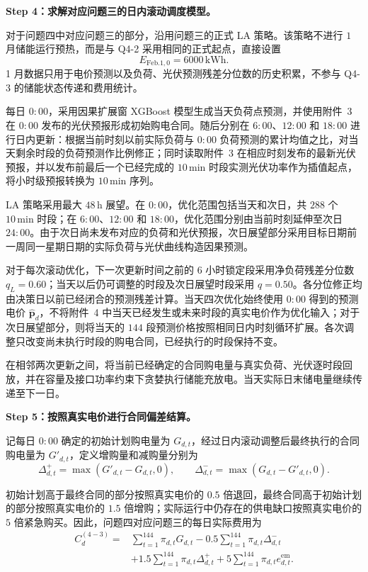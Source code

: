 \textbf{Step 4：求解对应问题三的日内滚动调度模型。}

对于问题四中对应问题三的部分，沿用问题三的正式 LA 策略。该策略不进行 $1$ 月储能运行预热，而是与 Q4-2 采用相同的正式起点，直接设置
\begin{equation}
E_{\mathrm{Feb.1},0}=6000\,\mathrm{kWh}.
\end{equation}
1 月数据只用于电价预测以及负荷、光伏预测残差分位数的历史积累，不参与 Q4-3 的储能状态传递和费用统计。

每日 $0{:}00$，采用因果扩展窗 XGBoost 模型生成当天负荷点预测，并使用附件~3 在 $0{:}00$ 发布的光伏预报形成初始购电合同。随后分别在 $6{:}00$、$12{:}00$ 和 $18{:}00$ 进行日内更新：根据当前时刻以前实际负荷与 $0{:}00$ 负荷预测的累计均值之比，对当天剩余时段的负荷预测作比例修正；同时读取附件~3 在相应时刻发布的最新光伏预报，并以发布前最后一个已经完成的 $10\,\mathrm{min}$ 时段实测光伏功率作为插值起点，将小时级预报转换为 $10\,\mathrm{min}$ 序列。

LA 策略采用最大 $48\,\mathrm{h}$ 展望。在 $0{:}00$，优化范围包括当天和次日，共 $288$ 个 $10\,\mathrm{min}$ 时段；在 $6{:}00$、$12{:}00$ 和 $18{:}00$，优化范围分别由当前时刻延伸至次日 $24{:}00$。由于次日尚未发布对应的负荷和光伏预报，次日展望部分采用目标日期前一周同一星期日期的实际负荷与光伏曲线构造因果预测。

对于每次滚动优化，下一次更新时间之前的 $6$ 小时锁定段采用净负荷残差分位数 $q_L=0.60$；当天以后仍可调整的时段及次日展望时段采用 $q=0.50$。各分位修正均由决策日以前已经闭合的预测残差计算。当天四次优化始终使用 $0{:}00$ 得到的预测电价 $\hat{\boldsymbol p}_{d}$，不将附件~4 中当天已经发生或未来时段的真实电价作为优化输入；对于次日展望部分，则将当天的 $144$ 段预测价格按照相同日内时刻循环扩展。各次调整只改变尚未执行时段的购电合同，已经执行的时段保持不变。

在相邻两次更新之间，将当前已经确定的合同购电量与真实负荷、光伏逐时段回放，并在容量及接口功率约束下贪婪执行储能充放电。当天实际日末储电量继续传递至下一日。

\textbf{Step 5：按照真实电价进行合同偏差结算。}

记每日 $0{:}00$ 确定的初始计划购电量为 $G_{d,t}$，经过日内滚动调整后最终执行的合同购电量为 $G'_{d,t}$，定义增购量和减购量分别为
\begin{equation}
\Delta_{d,t}^{+}
=
\max\left(G'_{d,t}-G_{d,t},0\right),
\qquad
\Delta_{d,t}^{-}
=
\max\left(G_{d,t}-G'_{d,t},0\right).
\end{equation}

初始计划高于最终合同的部分按照真实电价的 $0.5$ 倍退回，最终合同高于初始计划的部分按照真实电价的 $1.5$ 倍增购；实际运行中仍存在的供电缺口按照真实电价的 $5$ 倍紧急购买。因此，问题四对应问题三的每日实际费用为
\begin{equation}
\begin{aligned}
C_{d}^{(4-3)}
={}&
\sum_{t=1}^{144}\pi_{d,t}G_{d,t}
-
0.5\sum_{t=1}^{144}\pi_{d,t}\Delta_{d,t}^{-}\\
&+
1.5\sum_{t=1}^{144}\pi_{d,t}\Delta_{d,t}^{+}
+
5\sum_{t=1}^{144}\pi_{d,t}e_{d,t}^{\mathrm{em}}.
\end{aligned}
\label{eq:q43_actual_cost}
\end{equation}

